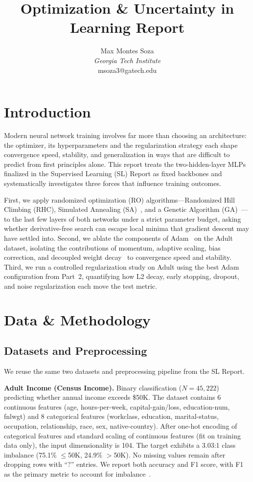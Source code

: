 \documentclass[10 pt, twocolumn]{article}
\title{\LARGE \bf
Optimization \& Uncertainty in Learning Report
}
\author{Max Montes Soza \\
\textit{Georgia Tech Institute} \\
msoza3@gatech.edu%
}
\begin{document}
\maketitle
\thispagestyle{empty}
\pagestyle{empty}

\section{Introduction}

Modern neural network training involves far more than choosing an architecture: the optimizer, its hyperparameters and the regularization strategy each shape convergence speed, stability, and generalization in ways that are difficult to predict from first principles alone. This report treats the two-hidden-layer MLPs finalized in the Supervised Learning (SL) Report as fixed backbones and systematically investigates three forces that influence training outcomes.

First, we apply randomized optimization (RO) algorithms---Randomized Hill Climbing (RHC), Simulated Annealing (SA)~\cite{kirkpatrick1983optimization}, and a Genetic Algorithm (GA)~\cite{mitchell1998introduction}---to the last few layers of both networks under a strict parameter budget, asking whether derivative-free search can escape local minima that gradient descent may have settled into. Second, we ablate the components of Adam~\cite{kingma2015adam} on the Adult dataset, isolating the contributions of momentum, adaptive scaling, bias correction, and decoupled weight decay~\cite{loshchilov2019decoupled} to convergence speed and stability. Third, we run a controlled regularization study on Adult using the best Adam configuration from Part~2, quantifying how L2 decay, early stopping, dropout, and noise regularization each move the test metric.

\section{Data \& Methodology}

\subsection{Datasets and Preprocessing}

We reuse the same two datasets and preprocessing pipeline from the SL Report.

\textbf{Adult Income (Census Income).} Binary classification ($N = 45{,}222$) predicting whether annual income exceeds \$50K. The dataset contains 6 continuous features (age, hours-per-week, capital-gain/loss, education-num, fnlwgt) and 8 categorical features (workclass, education, marital-status, occupation, relationship, race, sex, native-country). After one-hot encoding of categorical features and standard scaling of continuous features (fit on training data only), the input dimensionality is 104. The target exhibits a 3.03:1 class imbalance (75.1\% $\leq$50K, 24.9\% $>$50K). No missing values remain after dropping rows with ``?'' entries. We report both accuracy and F1 score, with F1 as the primary metric to account for imbalance~\cite{adult_dataset}.
\end{document}
